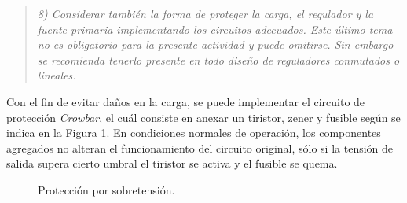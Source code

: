 \begin{quote} \textit{8) Considerar también la forma de proteger la carga, el regulador y la fuente primaria implementando los circuitos adecuados. Este último tema no es obligatorio para la presente actividad y puede omitirse. Sin embargo se recomienda tenerlo presente en todo diseño de reguladores conmutados o lineales.}
\end{quote}

Con el fin de evitar daños en la carga, se puede implementar el circuito de protección \textit{Crowbar}, el cuál consiste en anexar un tiristor, zener y fusible según se indica en la Figura \ref{fig:crowbar}. En condiciones normales de operación, los componentes agregados no alteran el funcionamiento del circuito original, sólo si la tensión de salida supera cierto umbral el tiristor se activa y el fusible se quema.


\begin{figure}[H]
	\centering
	\scalebox{0.5}{}
	\caption{Protección por sobretensión.}
	\label{fig:crowbar}
\end{figure}


